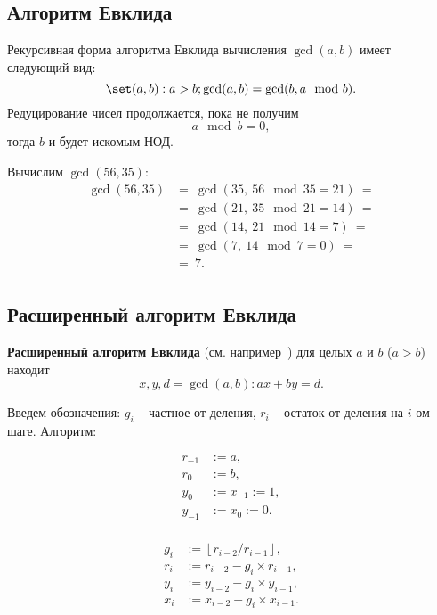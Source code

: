 \subsection{Алгоритм Евклида}

Рекурсивная форма алгоритма Евклида вычисления $\gcd(a,b)$ имеет следующий вид:
    \[\set(a,b): a>b;  \gcd(a,b) = \gcd(b, a \mod b). \]
Редуцирование чисел продолжается, пока не получим
    \[ a \mod b = 0, \]
тогда $b$ и будет искомым НОД.

\example
Вычислим $\gcd(56, 35)$:
\[ \begin{array}{ll}
    \gcd(56, 35) & =~ \gcd(35, ~ 56 \mod 35 = 21) ~= \\
    & =~ \gcd(21, ~ 35 \mod 21 = 14) ~= \\
    & =~ \gcd(14, ~ 21 \mod 14 = 7) ~= \\
    & =~ \gcd(7, ~ 14 \mod 7 = 0) ~= \\
    & =~ 7. \\
\end{array} \]
\exampleend


\subsection{Расширенный алгоритм Евклида}

\textbf{Расширенный алгоритм Евклида} (см. например~\cite[8.8 Наибольшие общие делители и алгоритм Евклида]{Aho:1979}) для целых $a$ и $b$ ($a > b$) находит
    \[ x, y, d = \gcd(a,b): ax + by = d. \]

Введем обозначения: $g_i$ -- частное от деления, $r_i$ -- остаток от деления на $i$-ом шаге. Алгоритм:

\[\begin{array}{ll}
	r_{-1} & := a, \\
	r_0 & := b, \\
	y_0 & := x_{-1} := 1, \\
	y_{-1} & := x_0 := 0. \\
\end{array}\]

\[\begin{array}{ll}
	g_i & := \left\lfloor r_{i-2} / r_{i-1} \right\rfloor, \\
	r_i & := r_{i-2} - g_i \times r_{i-1}, \\
	y_i & := y_{i-2} - g_i \times y_{i-1} , \\
	x_i & := x_{i-2} - g_i \times x_{i-1} . \\
\end{array}\]

